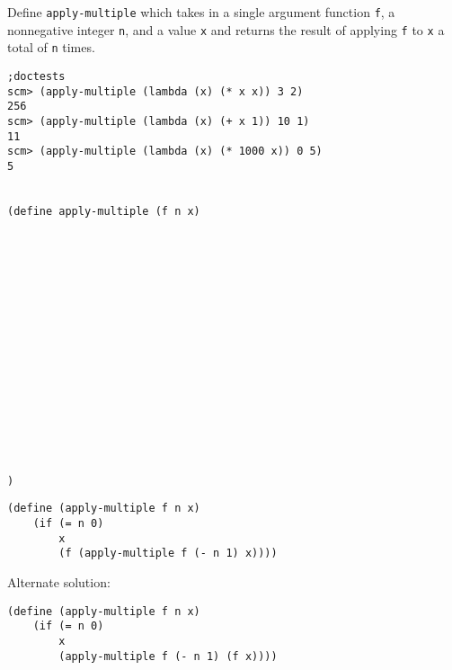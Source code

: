 \question Define \lstinline{apply-multiple} which takes in a single argument function \lstinline{f}, 
a nonnegative integer \lstinline{n}, and a value \lstinline{x} and returns the result of applying 
\lstinline{f} to \lstinline{x} a total of \lstinline{n} times.

\begin{lstlisting}
;doctests
scm> (apply-multiple (lambda (x) (* x x)) 3 2)
256
scm> (apply-multiple (lambda (x) (+ x 1)) 10 1)
11
scm> (apply-multiple (lambda (x) (* 1000 x)) 0 5)
5


(define apply-multiple (f n x)

















)
\end{lstlisting}
\begin{solution}
\begin{lstlisting}
(define (apply-multiple f n x)
    (if (= n 0)
        x
        (f (apply-multiple f (- n 1) x))))
\end{lstlisting}

Alternate solution:

\begin{lstlisting}
(define (apply-multiple f n x)
    (if (= n 0)
        x
        (apply-multiple f (- n 1) (f x))))
\end{lstlisting}


\end{solution}